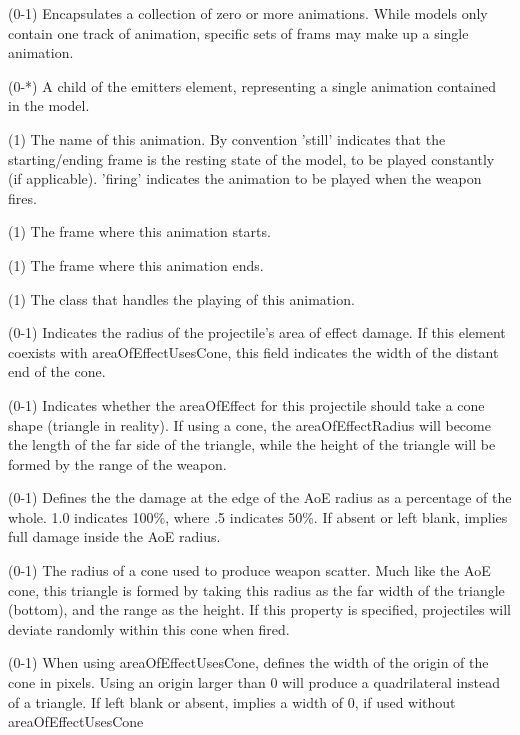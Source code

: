 \begin{description}
\item {} (0-1)  Encapsulates a collection of zero or more animations.  While models only contain one track of animation, specific sets of frams may make up a single animation.
\item {} (0-*)  A child of the emitters element, representing a single animation contained in the model.
\item {} (1)  The name of this animation.  By convention 'still' indicates that the starting/ending frame is the resting state of the model, to be played constantly (if applicable).  'firing' indicates the animation to be played when the weapon fires.
\item {} (1)  The frame where this animation starts.
\item {} (1)  The frame where this animation ends.
\item {} (1)  The class that handles the playing of this animation.  
\item {} (0-1)  Indicates the radius of the projectile's area of effect damage.  If this element coexists with areaOfEffectUsesCone, this field indicates the width of the distant end of the cone.
\item {} (0-1)  Indicates whether the areaOfEffect for this projectile should take a cone shape (triangle in reality).  If using a cone, the areaOfEffectRadius will become the length of the far side of the triangle, while the height of the triangle will be formed by the range of the weapon. 
\item {} (0-1)  Defines the the damage at the edge of the AoE radius as a percentage of the whole. 1.0 indicates 100\%, where .5 indicates 50\%.  If absent or left blank, implies full damage inside the AoE radius.
\item {} (0-1)  The radius of a cone used to produce weapon scatter.  Much like the AoE cone, this triangle is formed by taking this radius as the far width of the triangle (bottom), and the range as the height.  If this property is specified, projectiles will deviate randomly within this cone when fired.
\item {} (0-1)  When using areaOfEffectUsesCone, defines the width of the origin of the cone in pixels.  Using an origin larger than 0 will produce a quadrilateral instead of a triangle.  If left blank or absent, implies a width of 0, if used without areaOfEffectUsesCone

\end{description}
